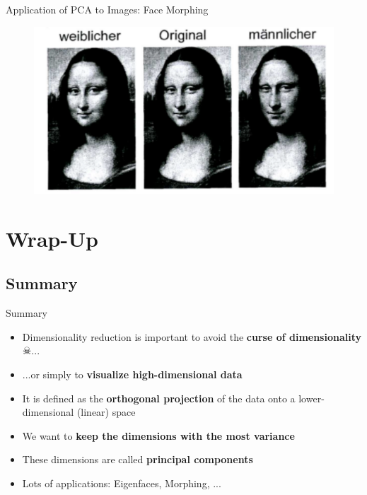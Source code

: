 \begin{frame}{Application of PCA to Images: Face Morphing}{}
	\begin{figure}
		\centering
		\includegraphics[scale=0.35]{13_pca/02_img/face_morphing}
	\end{figure}
\end{frame}


\section{Wrap-Up}

\subsection{Summary}

\begin{frame}{Summary}{}
	\begin{itemize}
		\item Dimensionality reduction is important to avoid the \textbf{curse of dimensionality} $\skull$...
		\item ...or simply to \textbf{visualize high-dimensional data}
		\item It is defined as the \textbf{orthogonal projection} of the data onto a lower-dimensional (linear) space
		\item We want to \textbf{keep the dimensions with the most variance}
		\item These dimensions are called \textbf{principal components}
		\item Lots of applications: Eigenfaces, Morphing, ...
	\end{itemize}
\end{frame}


